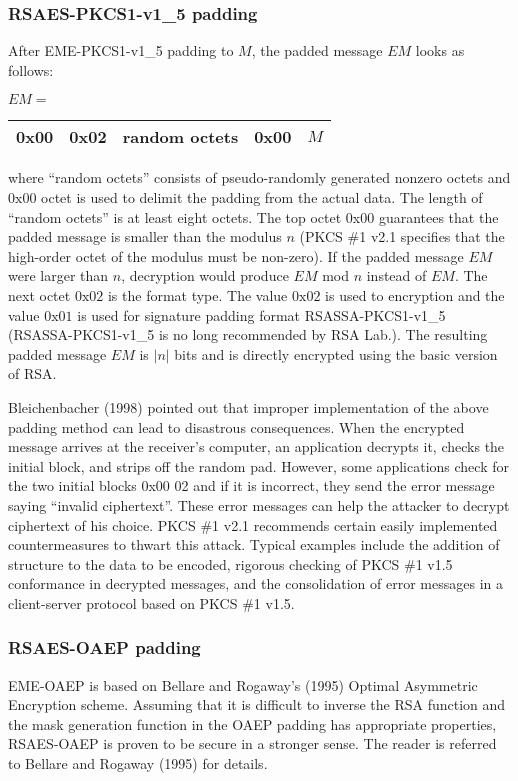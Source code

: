 \documentclass{article}
\begin{document}
\subsubsection{RSAES-PKCS1-v1\_5 padding}
After EME-PKCS1-v1\_5 padding to $M$, the padded message $EM$ looks 
as follows:
\begin{center}
$EM=\ \ $\begin{tabular}{|c|c|c|c|c|}\hline
0x00 & 0x02 & random octets & 0x00 & $M$\\ \hline
\end{tabular}
\end{center}
where ``random octets'' consists of pseudo-randomly generated 
nonzero octets and $0\mbox{x}00$ octet is used to delimit 
the padding from the actual data.
The length of ``random octets'' is at least eight octets.
The top octet 0x00 guarantees that the padded message 
is smaller than the modulus $n$ (PKCS \#1 v2.1 specifies that 
the high-order octet of the modulus must be non-zero). 
If the padded message $EM$ were 
larger than $n$,  decryption would produce $EM$ mod $n$ instead of $EM$. 
The next octet $0\mbox{x}02$ is the format type.
The value  $0\mbox{x}02$ is used to encryption and the value
$0\mbox{x}01$ is used for signature padding format  RSASSA-PKCS1-v1\_5 
(RSASSA-PKCS1-v1\_5 is no long recommended by RSA Lab.).
The resulting padded message $EM$ is
$|n|$ bits and is directly encrypted using the basic version of
RSA.

Bleichenbacher (1998) pointed out that improper implementation
of the above padding method can lead to disastrous consequences.
When the encrypted message arrives at the receiver's computer,
an application decrypts it, checks the initial block, and strips off the 
random pad. However, some applications check for the two initial
blocks 0x00 02 and if it is incorrect, they send the error
message saying ``invalid ciphertext''. These error messages can help
the attacker to decrypt ciphertext of his choice.
PKCS \#1 v2.1 recommends certain easily implemented countermeasures 
to thwart this attack. Typical examples include the addition
of structure to the data to be encoded, rigorous checking of 
PKCS \#1 v1.5 conformance in decrypted messages, and the consolidation of 
error messages in a client-server protocol based on PKCS \#1 v1.5.

\subsubsection{RSAES-OAEP padding}
EME-OAEP is based on Bellare and Rogaway's (1995) Optimal Asymmetric 
Encryption scheme.
Assuming that it is difficult to inverse the RSA function and the 
mask generation function in the OAEP padding has appropriate 
properties, RSAES-OAEP is proven to be secure in a stronger sense.
The reader is referred to Bellare and Rogaway (1995) for 
details.
\end{document}
